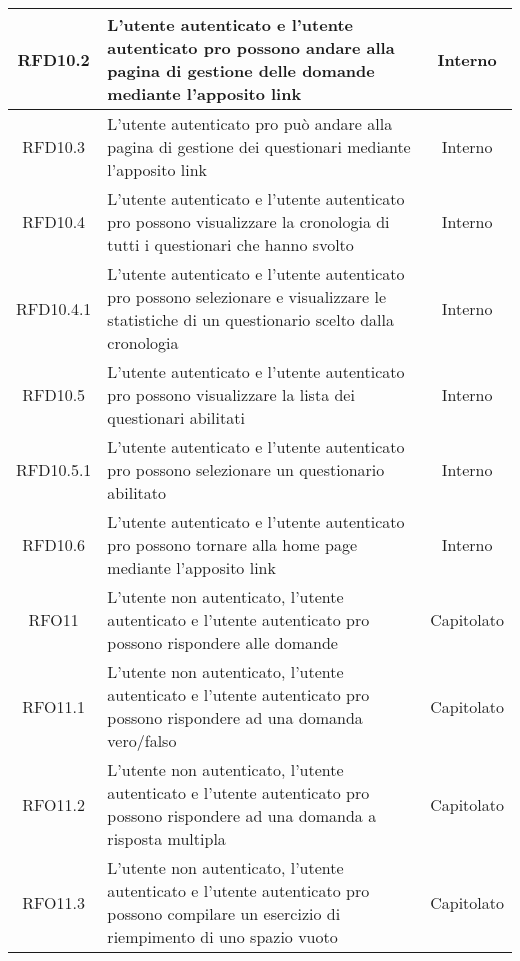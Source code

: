 \begin{longtable}{|c|>{\centering}m{7cm}|c|}
\hypertarget{RFD10.2}{RFD10.2} & L’utente autenticato e l’utente autenticato pro possono andare alla pagina di gestione delle domande mediante l’apposito link & Interno
\\ \hline

\hypertarget{RFD10.3}{RFD10.3} & L’utente autenticato pro può andare alla pagina di gestione dei questionari mediante l’apposito link & Interno
\\ \hline

\hypertarget{RFD10.4}{RFD10.4} & L’utente autenticato e l’utente autenticato pro possono visualizzare la cronologia di tutti i questionari che hanno svolto & Interno
\\ \hline

\hypertarget{RFD10.4.1}{RFD10.4.1} & L’utente autenticato e l’utente autenticato pro possono selezionare e visualizzare le statistiche di un questionario scelto dalla cronologia & Interno
\\ \hline

\hypertarget{RFD10.5}{RFD10.5} & L’utente autenticato e l’utente autenticato pro possono visualizzare la lista dei questionari abilitati & Interno
\\ \hline

\hypertarget{RFD10.5.1}{RFD10.5.1} & L’utente autenticato e l’utente autenticato pro possono selezionare un questionario abilitato & Interno
\\ \hline

\hypertarget{RFD10.6}{RFD10.6} & L’utente autenticato e l’utente autenticato pro possono tornare alla home page mediante l’apposito link  & Interno
\\ \hline

\hypertarget{RFO11}{RFO11} & L’utente non autenticato, l'utente autenticato e l’utente autenticato pro possono rispondere alle domande & Capitolato
\\ \hline

\hypertarget{RFO11.1}{RFO11.1} & L’utente non autenticato, l’utente autenticato e l’utente autenticato pro possono rispondere ad una domanda vero/falso & Capitolato
\\ \hline

\hypertarget{RFO11.2}{RFO11.2} & L’utente non autenticato, l’utente autenticato e l’utente autenticato pro possono rispondere ad una domanda a risposta multipla & Capitolato
\\ \hline

\hypertarget{RFO11.3}{RFO11.3} & L’utente non autenticato, l’utente autenticato e l’utente autenticato pro possono compilare un esercizio di riempimento di uno spazio vuoto & Capitolato
\\ \hline


\end{longtable}
